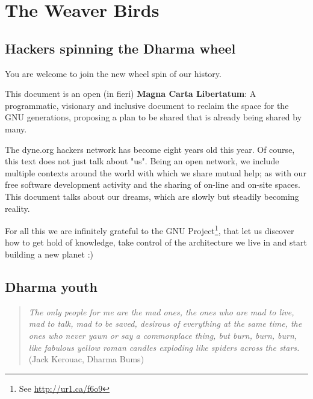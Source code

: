 \begin{savequote}
\end{savequote}
\chapter{The Weaver Birds}
\label{c:weaver_birds}

\section{Hackers spinning the Dharma wheel}
\label{s:weaver_birds:dharma_wheel}

You are welcome to join the new wheel spin of our history.

This document is an open (in f\hbox{}ieri) \textbf{Magna Carta Libertatum}: A
programmatic, visionary and inclusive document to reclaim the space for the GNU
generations, proposing a plan to be shared that is already being shared by many.

The dyne.org hackers network has become eight years old this year. Of course,
this text does not just talk about "us". Being an open network, we include
multiple contexts around the world with which we share mutual help; as with our
free software development activity and the sharing of on-line and on-site
spaces. This document talks about our dreams, which are slowly but steadily
becoming reality.

For all this we are inf\hbox{}initely grateful to the GNU Project\footnote{See
\url{http://ur1.ca/f6o9}}, that let us discover how to get hold of knowledge,
take control of the architecture we live in and start building a new planet :)


\section{Dharma youth}
\label{s:weaver_birds:dharma_youth}

\begin{quote}
\textit{The only people for me are the mad ones, the ones who are mad to live,
mad to talk, mad to be saved, desirous of everything at the same time, the ones
who never yawn or say a commonplace thing, but burn, burn, burn, like fabulous
yellow roman candles exploding like spiders across the stars.} (Jack Kerouac,
Dharma Bums)
\end{quote}

